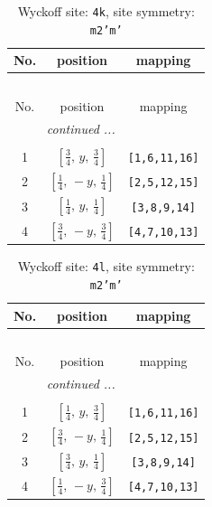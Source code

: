 \documentclass[fleqn,8pt]{jsarticle}
\begin{document}
\renewcommand{\arraystretch}{1.2}
\begin{longtable}{ccc}
\caption{Wyckoff site: {\tt 4k}, site symmetry: {\tt m2'm'}}
 \\
 \hline \hline
No. & position & mapping \\ \hline \endfirsthead

\multicolumn{2}{l}{\tablename\ \thetable{}} \\
 \hline \hline
No. & position & mapping \\ \hline \endhead

 \hline \hline
\multicolumn{2}{r}{\footnotesize\it continued ...} \\ \endfoot

 \hline \hline
\multicolumn{2}{r}{} \\ \endlastfoot

1 & $\left[ \frac{3}{4},\, y,\, \frac{3}{4} \right]$ & {\tt [1,6,11,16]} \\ \hline
2 & $\left[ \frac{1}{4},\, - y,\, \frac{1}{4} \right]$ & {\tt [2,5,12,15]} \\ \hline
3 & $\left[ \frac{1}{4},\, y,\, \frac{1}{4} \right]$ & {\tt [3,8,9,14]} \\ \hline
4 & $\left[ \frac{3}{4},\, - y,\, \frac{3}{4} \right]$ & {\tt [4,7,10,13]} \\
\end{longtable}
\renewcommand{\arraystretch}{1.2}
\begin{longtable}{ccc}
\caption{Wyckoff site: {\tt 4l}, site symmetry: {\tt m2'm'}}
 \\
 \hline \hline
No. & position & mapping \\ \hline \endfirsthead

\multicolumn{2}{l}{\tablename\ \thetable{}} \\
 \hline \hline
No. & position & mapping \\ \hline \endhead

 \hline \hline
\multicolumn{2}{r}{\footnotesize\it continued ...} \\ \endfoot

 \hline \hline
\multicolumn{2}{r}{} \\ \endlastfoot

1 & $\left[ \frac{1}{4},\, y,\, \frac{3}{4} \right]$ & {\tt [1,6,11,16]} \\ \hline
2 & $\left[ \frac{3}{4},\, - y,\, \frac{1}{4} \right]$ & {\tt [2,5,12,15]} \\ \hline
3 & $\left[ \frac{3}{4},\, y,\, \frac{1}{4} \right]$ & {\tt [3,8,9,14]} \\ \hline
4 & $\left[ \frac{1}{4},\, - y,\, \frac{3}{4} \right]$ & {\tt [4,7,10,13]} \\
\end{longtable}
\end{document}
